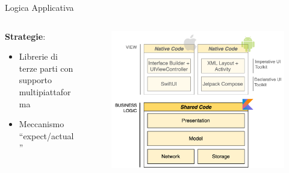 \begin{frame}{Logica Applicativa}
    \begin{columns}[onlytextwidth]
        \begin{column}{0.4\textwidth}
            \textbf{Strategie}:
            \begin{itemize}
                \item Librerie di terze parti con supporto multipiattaforma
                \item Meccanismo ``expect/actual''
            \end{itemize}
        \end{column}
        \begin{column}{0.6\textwidth}
             \begin{figure}[H]
                \includegraphics[width=1\textwidth]{img/stack_kmm_shared.png}
            \end{figure}
        \end{column}
    \end{columns}
\end{frame}

